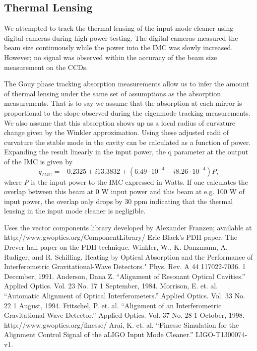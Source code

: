 \documentclass[10pt]{article}
\begin{document}
\subsection{Thermal Lensing}
We attempted to track the thermal lensing of the input mode cleaner using digital 
cameras during high power testing.  
The digital cameras measured the beam size continuously while the power into the 
IMC was slowly increased.  
However; no signal was observed within the accuracy of the beam size measurement on the CCDs.  

The Gouy phase tracking absorption measurements allow us to infer the amount of thermal 
lensing under the same set of assumptions as the absorption measurements.  
That is to say we assume that the absorption at each mirror is proportional to the slope 
observed during the eigenmode tracking measurements.  
We also assume that this absorption shows up as a local radius of curvature change 
given by the Winkler approximation.  
Using these adjusted radii of curvature the stable mode in the cavity can be calculated 
as a function of power.  
Expanding the result linearly in the input power, the q parameter at the 
output of the IMC is given by 
\begin{equation}
	q_{IMC}=-0.2325+i13.3832+(6.49\cdot10^{-4}-i8.26\cdot10^{-4})P,
\end{equation}	
where $P$ is the input power to the IMC expressed in Watts.  
If one calculates the overlap between this beam at 0 W input power and 
this beam at e.g. 100 W of input power, the overlap only drops by 30 ppm indicating that 
the thermal lensing in the input mode cleaner is negligible.  




\begin{thebibliography}{9}
		Uses the vector components library developed by Alexander Franzen; available at http://www.gwoptics.org/ComponentLibrary/
		Eric Black's PDH paper.
		The Drever hall paper on the PDH technique.		
		Winkler, W., K. Danzmann, A. Rudiger, and R. Schilling. Heating by Optical Absorption and 
		the Performance of Interferometric Gravitational-Wave Detectors." Phys. Rev. A 44 117022-7036. 1 December, 1991.
		Anderson, Dana Z.  ``Alignment of Resonant Optical Cavities.''  Applied Optics.  
		Vol. 23 No. 17 1 September, 1984.
		Morrison, E. et. al. ``Automatic Alignment of Optical Interferometers.''  Applied Optics.  
		Vol. 33 No. 22 1 August, 1994.
		Fritschel, P. et. al. ``Alignment of an Interferometric Gravitational Wave Detector.''  Applied Optics.  
		Vol. 37 No. 28 1 October, 1998.	
		http://www.gwoptics.org/finesse/
		Arai, K. et. al. ``Finesse Simulation for the Alignment Control Signal of the aLIGO Input Mode 
		Cleaner.'' LIGO-T1300074-v1.
\end{thebibliography}		
\end{document}
